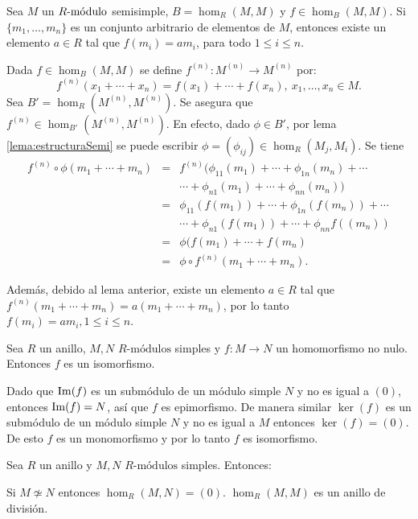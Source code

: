 \begin{teorema}
Sea $M$ un $\modulo{R}$ semisimple, $B= \hom_R(M,M)$ y $f \in  \hom_B(M,M)$. Si $\{ m_1, \dots, m_n \}$ es un conjunto arbitrario de elementos de $M$, entonces existe un elemento $a \in R$ tal que $f(m_i) = am_i$, para todo $1\leq i \leq n$.
\end{teorema}
\begin{proof*}
Dada $f \in \hom_B(M,M)$ se define $f^{(n)} \colon M^{(n)} \to M^{(n)}$ por: \[ f^{(n)}(x_1 + \cdots + x_n) = f(x_1) + \cdots+ f(x_n), \ x_1, \dots, x_n \in M. \]
Sea $B' = \hom_R(M^{(n)}, M^{(n)})$. Se asegura que $f^{(n)} \in \hom_{B'}(M^{(n)}, M^{(n)})$. En efecto, dado $\phi \in B'$, por lema \ref{lema:estructuraSemi} se puede escribir $\phi = (\phi_{ij}) \in \hom_R(M_j,M_i)$. Se tiene
\begin{eqnarray*}
f^{(n)} \circ \phi(m_1+\cdots +m_n) &=& f^{(n)}(\phi_{11}(m_1) +\cdots+\phi_{1n}(m_n)+\cdots\\ 
& &\cdots +\phi_{n1}(m_1)+\cdots+\phi_{nn}(m_n))  \\
&=& \phi_{11}(f(m_1)) + \cdots + \phi_{1n}(f(m_n)) + \cdots \\ 
& &\cdots + \phi_{n1}(f(m_1 )) + \cdots + \phi_{nn}f((m_n))   \\
&=& \phi(f(m_1) + \cdots + f(m_n)  \\
&=&\phi \circ f^{(n)}(m_1 + \cdots + m_n).
\end{eqnarray*}

Además, debido al lema anterior, existe un elemento $a \in R$ tal que $f^{(n)}(m_1+\cdots+m_n) = a(m_1+\cdots+m_n)$, por lo tanto $f(m_i) = am_i, 1\leq i \leq n$.
\end{proof*}
\begin{lema}
Sea $R$ un anillo, $M,N$ $R\mbox{-módulos}$ simples y $f \colon M \to N$ un homomorfismo no nulo. Entonces $f$ es un isomorfismo.
\end{lema}
\begin{proof*}
Dado que $\Ima(f)$ es un submódulo de un módulo simple $N$ y no es igual a $(0)$, entonces $\Ima(f) = N$, así que $f$ es epimorfismo. De manera similar $\ker(f)$ es un submódulo de un módulo simple $N$ y no es igual a $M$ entonces $\ker(f) = (0)$. De esto $f$ es un monomorfismo y por lo tanto $f$ es isomorfismo.
\end{proof*}
\begin{corolario}
Sea $R$ un anillo y $M,N$ $R\mbox{-módulos}$ simples. Entonces:
\begin{bulletList}
\newItem Si $M \not\simeq N$ entonces $\hom_R(M,N) = (0)$.
\newItem $\hom_R(M,M)$ es un anillo de división. 
\end{bulletList}
\end{corolario}
